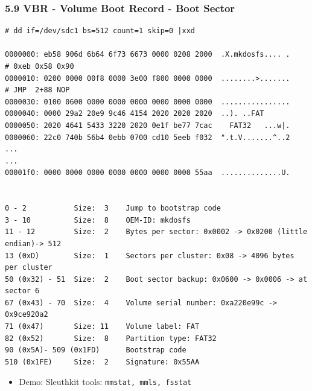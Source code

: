 \begin{frame}[fragile]
  \frametitle{5.9 VBR - Volume Boot Record - Boot Sector}
  \begin{lstlisting}[basicstyle=\tiny]
# dd if=/dev/sdc1 bs=512 count=1 skip=0 |xxd

0000000: eb58 906d 6b64 6f73 6673 0000 0208 2000  .X.mkdosfs.... .     # 0xeb 0x58 0x90
0000010: 0200 0000 00f8 0000 3e00 f800 0000 0000  ........>.......     # JMP  2+88 NOP
0000030: 0100 0600 0000 0000 0000 0000 0000 0000  ................
0000040: 0000 29a2 20e9 9c46 4154 2020 2020 2020  ..). ..FAT      
0000050: 2020 4641 5433 3220 2020 0e1f be77 7cac    FAT32   ...w|.
0000060: 22c0 740b 56b4 0ebb 0700 cd10 5eeb f032  ".t.V.......^..2
...
...
00001f0: 0000 0000 0000 0000 0000 0000 0000 55aa  ..............U.


0 - 2           Size:  3    Jump to bootstrap code
3 - 10          Size:  8    OEM-ID: mkdosfs
11 - 12         Size:  2    Bytes per sector: 0x0002 -> 0x0200 (little endian)-> 512
13 (0xD)        Size:  1    Sectors per cluster: 0x08 -> 4096 bytes per cluster
50 (0x32) - 51  Size:  2    Boot sector backup: 0x0600 -> 0x0006 -> at sector 6
67 (0x43) - 70  Size:  4    Volume serial number: 0xa220e99c -> 0x9ce920a2
71 (0x47)       Size: 11    Volume label: FAT
82 (0x52)       Size:  8    Partition type: FAT32
90 (0x5A)- 509 (0x1FD)	    Bootstrap code
510 (0x1FE)     Size:  2    Signature: 0x55AA
  \end{lstlisting}
    \begin{itemize}
        \item Demo: Sleuthkit tools: \texttt{mmstat, mmls, fsstat}
    \end{itemize}
\end{frame}








